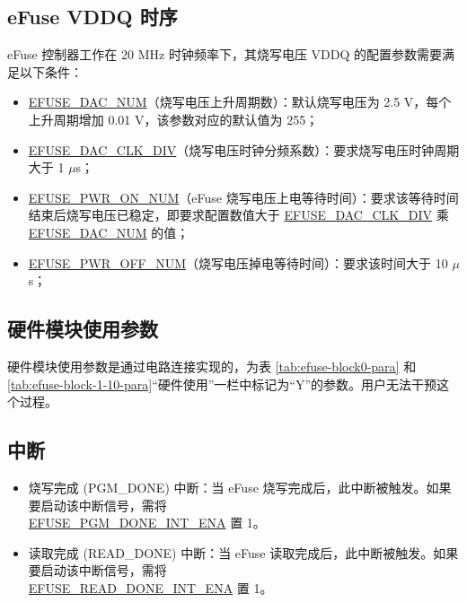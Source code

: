 \documentclass[main\_\_CN.tex]{subfiles}
\begin{document}
\subsection{eFuse VDDQ 时序}
\label{sec:eFuse-vddq-timing}

eFuse 控制器工作在 20 MHz 时钟频率下，其烧写电压 VDDQ 的配置参数需要满足以下条件：
\begin{itemize}
    \item \hyperref[fielddesc:EFUSEDACNUM]{EFUSE\_DAC\_NUM}（烧写电压上升周期数）：默认烧写电压为 2.5 V，每个上升周期增加 0.01 V，该参数对应的默认值为 255；
    \item \hyperref[fielddesc:EFUSEDACCLKDIV]{EFUSE\_DAC\_CLK\_DIV}（烧写电压时钟分频系数）：要求烧写电压时钟周期大于 1 $\mu$s；
    \item \hyperref[fielddesc:EFUSEPWRONNUM]{EFUSE\_PWR\_ON\_NUM}（eFuse 烧写电压上电等待时间）：要求该等待时间结束后烧写电压已稳定，即要求配置数值大于 \hyperref[fielddesc:EFUSEDACCLKDIV]{EFUSE\_DAC\_CLK\_DIV} 乘 \hyperref[fielddesc:EFUSEDACNUM]{EFUSE\_DAC\_NUM} 的值；
    \item \hyperref[fielddesc:EFUSEPWROFFNUM]{EFUSE\_PWR\_OFF\_NUM}（烧写电压掉电等待时间）：要求该时间大于 10 $\mu$s；
\end{itemize}




\subsection{硬件模块使用参数}

硬件模块使用参数是通过电路连接实现的，为表 \ref{tab:efuse-block0-para} 和 \ref{tab:efuse-block-1-10-para}“硬件使用”一栏中标记为“Y”的参数。用户无法干预这个过程。

\subsection{中断}
\begin{itemize}
\item 烧写完成 (PGM\_DONE) 中断：当 eFuse 烧写完成后，此中断被触发。如果要启动该中断信号，需将 \\\hyperref[fielddesc:EFUSEPGMDONEINTENA]{EFUSE\_PGM\_DONE\_INT\_ENA} 置 1。
\item 读取完成 (READ\_DONE) 中断：当 eFuse 读取完成后，此中断被触发。如果要启动该中断信号，需将 \\\hyperref[fielddesc:EFUSEREADDONEINTENA]{EFUSE\_READ\_DONE\_INT\_ENA} 置 1。
\end{itemize}
\end{document}
